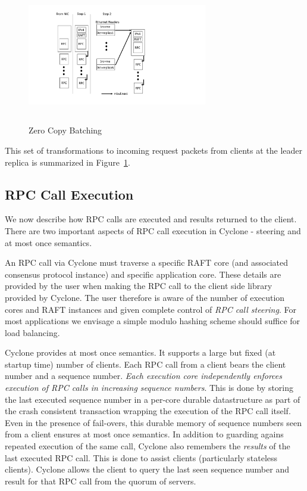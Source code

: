 \documentclass[letterpaper,twocolumn,10pt]{article}
\begin{document}
\begin{figure}
\includegraphics[width=0.7\textwidth,height=6cm]{figures/chain.pdf}
\caption{Zero Copy Batching}
\label{fig:zc_batch}
\end{figure}

This set of transformations to incoming request packets from clients at the
leader replica is summarized in Figure~\ref{fig:zc_batch}. 

\subsection{RPC Call Execution}
\label{sec:exec}
We now describe how RPC calls are executed and results returned to the
client. There are two important aspects of RPC call execution in Cyclone -
steering and at most once semantics.

An RPC call via Cyclone must traverse a specific RAFT core (and associated
consensus protocol instance) and specific application core. These details are
provided by the user when making the RPC call to the client side library
provided by Cyclone. The user therefore is aware of the number of execution
cores and RAFT instances and given complete control of \emph{RPC call steering}.
For most applications we envisage a simple modulo hashing scheme should suffice
for load balancing.

Cyclone provides at most once semantics. It supports a large but fixed (at
startup time) number of clients. Each RPC call from a client bears the client
number and a sequence number. \emph{Each execution core independently enforces
  execution of RPC calls in increasing sequence numbers}. This is done by
storing the last executed sequence number in a per-core durable datastructure as
part of the crash consistent transaction wrapping the execution of the RPC call
itself. Even in the presence of fail-overs, this durable memory of sequence
numbers seen from a client ensures at most once semantics. In addition to
guarding agains repeated execution of the same call, Cyclone also remembers the
\emph{results} of the last executed RPC call. This is done to assist clients
(particularly stateless clients). Cyclone allows the client to query the last
seen sequence number and result for that RPC call from the quorum of servers.
\end{document}
